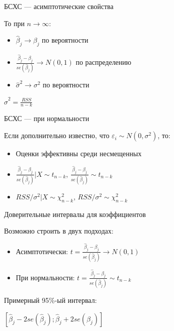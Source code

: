 \documentclass[russian,ignorenonframetext,]{beamer}
\providecommand{\tightlist}{%
  \setlength{\itemsep}{0pt}\setlength{\parskip}{0pt}}
\begin{document}
\begin{frame}{БСХС --- асимптотические свойства}

То при \(n\to \infty\):

\begin{itemize}
\tightlist
\item
  \(\hat{\beta}_j \to \beta_j\) по вероятности
\item
  \(\frac{\hat{\beta}_j-\beta_j}{se(\hat{\beta}_j)} \to N(0,1)\) по
  распределению
\item
  \(\hat{\sigma}^2 \to \sigma^2\) по вероятности
\end{itemize}

\(\hat{\sigma}^2=\frac{RSS}{n-k}\)

\end{frame}

\begin{frame}{БСХС --- при нормальности}

Если дополнительно известно, что \(\varepsilon_i \sim N(0, \sigma^2)\),
то:

\begin{itemize}
\tightlist
\item
  Оценки эффективны среди несмещенных
\item
  \(\frac{\hat{\beta}_j-\beta_j}{se(\hat{\beta}_j)}|X \sim t_{n-k}\),
  \(\frac{\hat{\beta}_j-\beta_j}{se(\hat{\beta}_j)}\sim t_{n-k}\)
\item
  \(RSS/\sigma^2 |X \sim \chi^2_{n-k}\),
  \(RSS/\sigma^2 \sim \chi^2_{n-k}\)
\end{itemize}

\end{frame}

\begin{frame}{Доверительные интервалы для коэффициентов}

Возможно строить в двух подходах:

\begin{itemize}
\item
  Асимптотически:
  \(t=\frac{\hat{\beta}_j-\beta_j}{se(\hat{\beta}_j)} \to N(0,1)\)
\item
  При нормальности:
  \(t=\frac{\hat{\beta}_j-\beta_j}{se(\hat{\beta}_j)} \sim t_{n-k}\)
\end{itemize}

Примерный 95\%-ый интервал:

\([\hat{\beta}_j-2se(\hat{\beta}_j);\hat{\beta}_j+2se(\hat{\beta}_j) ]\)

\end{frame}
\end{document}
